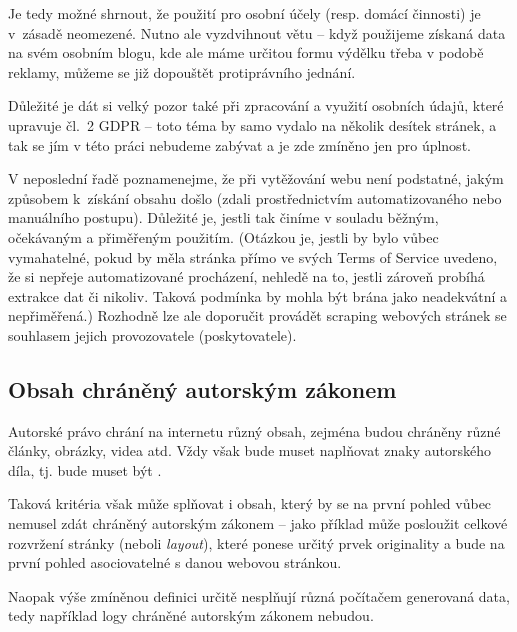 \documentclass[thesis=B,czech]{FITthesis}[2012/06/26]
\begin{document}
Je tedy možné shrnout, že použití pro osobní účely (resp. domácí činnosti) je v zásadě neomezené. Nutno ale vyzdvihnout větu  -- když použijeme získaná data na svém osobním blogu, kde ale máme určitou formu výdělku třeba v podobě reklamy, můžeme se již dopouštět protiprávního jednání.

Důležité je dát si velký pozor také při zpracování a využití osobních údajů, které upravuje čl.~2 GDPR -- toto téma by samo vydalo na několik desítek stránek, a tak se jím v této práci nebudeme zabývat a je zde zmíněno jen pro úplnost.

V neposlední řadě poznamenejme, že při vytěžování webu není podstatné, jakým způsobem k získání obsahu došlo (zdali prostřednictvím automatizovaného nebo manuálního postupu). Důležité je, jestli tak činíme v souladu běžným, očekávaným a přiměřeným použitím. (Otázkou je, jestli by bylo vůbec vymahatelné, pokud by měla stránka přímo ve svých Terms of Service uvedeno, že si nepřeje automatizované procházení, nehledě na to, jestli zároveň probíhá extrakce dat či nikoliv. Taková podmínka by mohla být brána jako neadekvátní a nepřiměřená.) Rozhodně lze ale doporučit provádět scraping webových stránek se souhlasem jejich provozovatele (poskytovatele).\cite{rozhovor}

\subsection{Obsah chráněný autorským zákonem}
Autorské právo chrání na internetu různý obsah, zejména budou chráněny různé články, obrázky, videa atd. Vždy však bude muset naplňovat znaky autorského díla, tj. bude muset být \cite[\S~2 odst.~1]{autorsky_zakon}.

Taková kritéria však může splňovat i obsah, který by se na první pohled vůbec nemusel zdát chráněný autorským zákonem -- jako příklad může posloužit celkové rozvržení stránky (neboli \textit{layout}), které ponese určitý prvek originality a bude na první pohled asociovatelné s danou webovou stránkou.

Naopak výše zmíněnou definici určitě nesplňují různá počítačem generovaná data, tedy například logy chráněné autorským zákonem nebudou.
\end{document}
